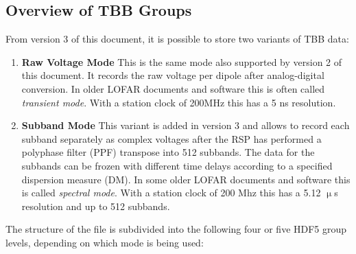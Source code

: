 \documentclass[a4paper,10pt,bibtotoc]{scrartcl}
\begin{document}
\subsection{Overview of TBB Groups}

From version 3 of this document, it is possible to store two variants of TBB data:
\begin{enumerate}
\item \textbf{Raw Voltage Mode} This is the same mode also supported by version 2 of this document. It records the raw voltage per dipole after analog-digital conversion. In older LOFAR documents and software this is often called \emph{transient mode}. With a station clock of 200MHz this has a 5 ns resolution.%
\item \textbf{Subband Mode} This variant is added in version 3 and allows to record each subband separately as complex voltages after the RSP has performed a polyphase filter (PPF) transpose into 512 subbands. The data for the subbands can be frozen with different time delays according to a specified dispersion measure (DM). In some older LOFAR documents and software this is called \emph{spectral mode}. With a station clock of 200 Mhz this has a 5.12 $\upmu$s resolution and up to 512 subbands.%
\end{enumerate}

The structure of the file is subdivided into the following four or five HDF5 group levels, depending on which mode is being used:
\end{document}
